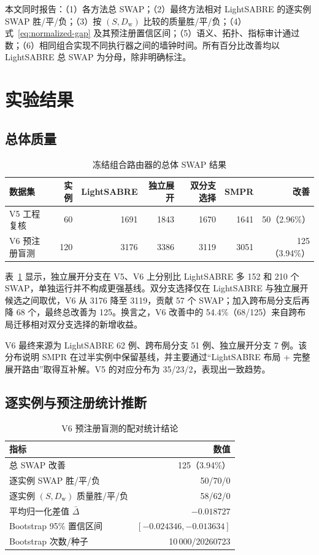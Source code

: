 \documentclass[11pt,a4paper]{article}
\newcommand{\DepthW}{D_{\mathrm w}}
\begin{document}
本文同时报告：（1）各方法总 SWAP；（2）最终方法相对 LightSABRE 的逐实例 SWAP 胜/平/负；（3）按 $(S,\DepthW)$ 比较的质量胜/平/负；（4）式~\eqref{eq:normalized-gap} 及其预注册置信区间；（5）语义、拓扑、指标审计通过数；（6）相同组合实现不同执行器之间的墙钟时间。所有百分比改善均以 LightSABRE 总 SWAP 为分母，除非明确标注。

\section{实验结果}

\subsection{总体质量}

\begin{table}[H]
\centering
\small
\caption{冻结组合路由器的总体 SWAP 结果}
\label{tab:overall}
\begin{tabular}{lrrrrrr}
\toprule
数据集 & 实例 & LightSABRE & 独立展开 & 双分支选择 & SMPR & 改善 \\
\midrule
V5 工程复核 & 60 & 1691 & 1843 & 1670 & 1641 & 50（2.96\%）\\
V6 预注册盲测 & 120 & 3176 & 3386 & 3119 & 3051 & 125（3.94\%）\\
\bottomrule
\end{tabular}
\end{table}

表~\ref{tab:overall} 显示，独立展开分支在 V5、V6 上分别比 LightSABRE 多 152 和 210 个 SWAP，单独运行并不构成更强基线。双分支选择仅在 LightSABRE 与独立展开候选之间取优，V6 从 3176 降至 3119，贡献 57 个 SWAP；加入跨布局分支后再降 68 个，最终总改善为 125。换言之，V6 改善中的 54.4\%（68/125）来自跨布局迁移相对双分支选择的新增收益。

V6 最终来源为 LightSABRE 62 例、跨布局分支 51 例、独立展开分支 7 例。该分布说明 SMPR 在过半实例中保留基线，并主要通过“LightSABRE 布局 + 完整展开路由”取得互补解。V5 的对应分布为 35/23/2，表现出一致趋势。

\subsection{逐实例与预注册统计推断}

\begin{table}[H]
\centering
\small
\caption{V6 预注册盲测的配对统计结论}
\label{tab:inference}
\begin{tabular}{lr}
\toprule
指标 & 数值 \\
\midrule
总 SWAP 改善 & 125（3.94\%）\\
逐实例 SWAP 胜/平/负 & 50/70/0 \\
逐实例 $(S,\DepthW)$ 质量胜/平/负 & 58/62/0 \\
平均归一化差值 $\bar\Delta$ & $-0.018727$ \\
Bootstrap 95\% 置信区间 & $[-0.024346,-0.013634]$ \\
Bootstrap 次数/种子 & 10\,000/20260723 \\
\bottomrule
\end{tabular}
\end{table}
\end{document}
